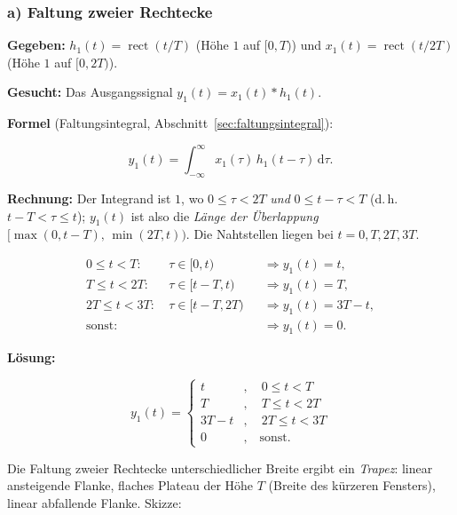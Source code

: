 \subsubsection*{a) Faltung zweier Rechtecke}

\begin{beispiel}

\textbf{Gegeben:} $h_1(t) = \operatorname{rect}(t/T)$ (Höhe $1$ auf $[0,T)$) und
$x_1(t) = \operatorname{rect}(t/2T)$ (Höhe $1$ auf $[0, 2T)$).

\textbf{Gesucht:} Das Ausgangssignal $y_1(t) = x_1(t) * h_1(t)$.

\textbf{Formel} (Faltungsintegral, Abschnitt~\ref{sec:faltungsintegral}):

$$
y_1(t) = \int_{-\infty}^{\infty} x_1(\tau)\, h_1(t - \tau)\,\mathrm{d}\tau.
$$

\textbf{Rechnung:} Der Integrand ist $1$, wo $0 \leq \tau < 2T$ \emph{und}
$0 \leq t - \tau < T$ (d.\,h.\ $t - T < \tau \leq t$); $y_1(t)$ ist also die
\emph{Länge der Überlappung} $[\max(0, t-T),\, \min(2T, t))$. Die Nahtstellen
liegen bei $t = 0, T, 2T, 3T$.

$$
\begin{aligned}
0 \leq t < T:\ & \tau \in [0, t) &&\Rightarrow y_1(t) = t, \\
T \leq t < 2T:\ & \tau \in [t - T, t) &&\Rightarrow y_1(t) = T, \\
2T \leq t < 3T:\ & \tau \in [t - T, 2T) &&\Rightarrow y_1(t) = 3T - t, \\
\text{sonst:}\ & &&\Rightarrow y_1(t) = 0.
\end{aligned}
$$

\textbf{Lösung:}

$$
\boxed{\;y_1(t) = \begin{cases}
t & , \quad 0 \leq t < T \\[2pt]
T & , \quad T \leq t < 2T \\[2pt]
3T - t & , \quad 2T \leq t < 3T \\[2pt]
0 & , \quad \text{sonst.}
\end{cases}\;}
$$

Die Faltung zweier Rechtecke unterschiedlicher Breite ergibt ein \emph{Trapez}:
linear ansteigende Flanke, flaches Plateau der Höhe $T$ (Breite des kürzeren
Fensters), linear abfallende Flanke. Skizze:

\begin{center}
\end{center}

\end{beispiel}

